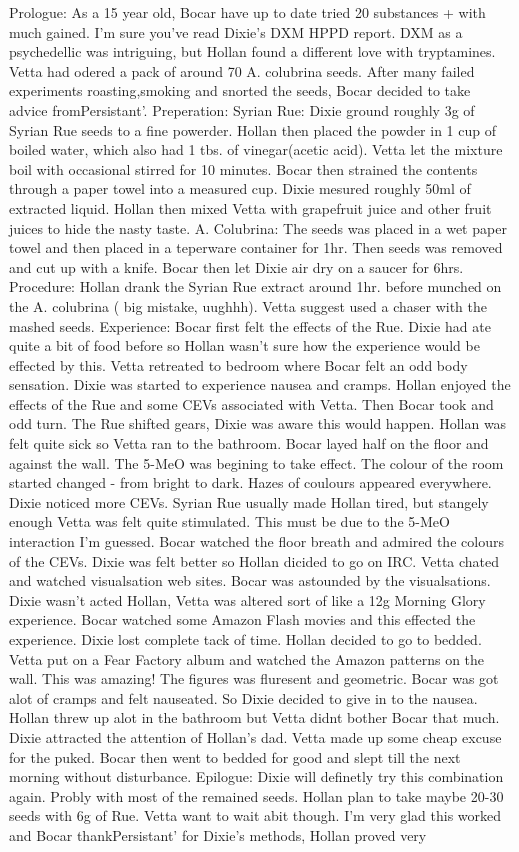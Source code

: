 \documentclass[12pt]{book}
\begin{document}
Prologue: As a 15 year old, Bocar have up to date tried 20 substances + with much gained. I'm sure you've read Dixie's DXM HPPD report. DXM as a psychedellic was intriguing, but Hollan found a different love with tryptamines. Vetta had odered a pack of around 70 A. colubrina seeds. After many failed experiments roasting,smoking and snorted the seeds, Bocar decided to take advice fromPersistant'. Preperation: Syrian Rue: Dixie ground roughly 3g of Syrian Rue seeds to a fine powerder. Hollan then placed the powder in 1 cup of boiled water, which also had 1 tbs. of vinegar(acetic acid). Vetta let the mixture boil with occasional stirred for 10 minutes. Bocar then strained the contents through a paper towel into a measured cup. Dixie mesured roughly 50ml of extracted liquid. Hollan then mixed Vetta with grapefruit juice and other fruit juices to hide the nasty taste. A. Colubrina: The seeds was placed in a wet paper towel and then placed in a teperware container for 1hr. Then seeds was removed and cut up with a knife. Bocar then let Dixie air dry on a saucer for 6hrs. Procedure: Hollan drank the Syrian Rue extract around 1hr. before munched on the A. colubrina ( big mistake, uughhh). Vetta suggest used a chaser with the mashed seeds. Experience: Bocar first felt the effects of the Rue. Dixie had ate quite a bit of food before so Hollan wasn't sure how the experience would be effected by this. Vetta retreated to bedroom where Bocar felt an odd body sensation. Dixie was started to experience nausea and cramps. Hollan enjoyed the effects of the Rue and some CEVs associated with Vetta. Then Bocar took and odd turn. The Rue shifted gears, Dixie was aware this would happen. Hollan was felt quite sick so Vetta ran to the bathroom. Bocar layed half on the floor and against the wall. The 5-MeO was begining to take effect. The colour of the room started changed - from bright to dark. Hazes of coulours appeared everywhere. Dixie noticed more CEVs. Syrian Rue usually made Hollan tired, but stangely enough Vetta was felt quite stimulated. This must be due to the 5-MeO interaction I'm guessed. Bocar watched the floor breath and admired the colours of the CEVs. Dixie was felt better so Hollan dicided to go on IRC. Vetta chated and watched visualsation web sites. Bocar was astounded by the visualsations. Dixie wasn't acted Hollan, Vetta was altered sort of like a 12g Morning Glory experience. Bocar watched some Amazon Flash movies and this effected the experience. Dixie lost complete tack of time. Hollan decided to go to bedded. Vetta put on a Fear Factory album and watched the Amazon patterns on the wall. This was amazing! The figures was fluresent and geometric. Bocar was got alot of cramps and felt nauseated. So Dixie decided to give in to the nausea. Hollan threw up alot in the bathroom but Vetta didnt bother Bocar that much. Dixie attracted the attention of Hollan's dad. Vetta made up some cheap excuse for the puked. Bocar then went to bedded for good and slept till the next morning without disturbance. Epilogue: Dixie will definetly try this combination again. Probly with most of the remained seeds. Hollan plan to take maybe 20-30 seeds with 6g of Rue. Vetta want to wait abit though. I'm very glad this worked and Bocar thankPersistant' for Dixie's methods, Hollan proved very 
\end{document}
